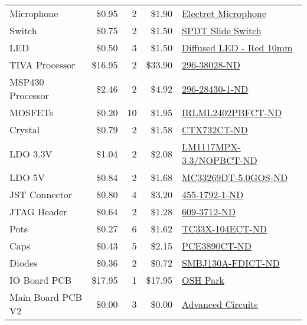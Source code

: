 \begin{table}[h]
\begin{tabular}{lrrrl}
        Microphone & \$0.95 & 2 & \$1.90 & \href{https://www.sparkfun.com/products/8635}{Electret Microphone}\\
        Switch & \$0.75 & 2 & \$1.50 & \href{https://www.sparkfun.com/products/9609}{SPDT Slide Switch}\\
        LED & \$0.50 & 3 & \$1.50 & \href{https://www.sparkfun.com/products/10632}{Diffused LED - Red 10mm}\\
        TIVA Processor & \$16.95 & 2 & \$33.90 & \href{https://www.digikey.com/product-detail/en/TM4C1294NCPDTI3/296-38028-ND/4914951}{296-38028-ND}\\
        MSP430 Processor & \$2.46 & 2 & \$4.92 & \href{https://www.digikey.com/product-detail/en/MSP430G2553IPW20R/296-28430-1-ND/2638889}{296-28430-1-ND}\\
        MOSFETs & \$0.20 & 10 & \$1.95 & \href{https://www.digikey.com/product-detail/en/IRLML2402TRPBF/IRLML2402PBFCT-ND/812508}{IRLML2402PBFCT-ND}\\
        Crystal & \$0.79 & 2 & \$1.58 & \href{https://www.digikey.com/product-detail/en/403C11E16M00000/CTX732CT-ND/1638187}{CTX732CT-ND}\\
        LDO 3.3V & \$1.04 & 2 & \$2.08 & \href{https://www.digikey.com/product-detail/en/LM1117MPX-3.3\%2FNOPB/LM1117MPX-3.3\%2FNOPBCT-ND/1010516}{LM1117MPX-3.3/NOPBCT-ND}\\
        LDO 5V & \$0.84 & 2 & \$1.68 & \href{https://www.digikey.com/product-detail/en/MC33269DT-5.0G/MC33269DT-5.0GOS-ND/1479179}{MC33269DT-5.0GOS-ND}\\
        JST Connector & \$0.80 & 4 & \$3.20 & \href{https://www.digikey.com/product-detail/en/BM06B-SRSS-TB(LF)(SN)/455-1792-1-ND/926863}{455-1792-1-ND}\\
        JTAG Header & \$0.64 & 2 & \$1.28 & \href{https://www.digikey.com/product-detail/en/20021111-00010T4LF/609-3712-ND/2209072}{609-3712-ND}\\
        Pots & \$0.27 & 6 & \$1.62 & \href{https://www.digikey.com/product-detail/en/TC33X-2-104E/TC33X-104ECT-ND/612912}{TC33X-104ECT-ND}\\
        Caps & \$0.43 & 5 & \$2.15 & \href{https://www.digikey.com/product-detail/en/EEE-1CA470WR/PCE3890CT-ND/766266}{PCE3890CT-ND}\\
        Diodes & \$0.36 & 2 & \$0.72 & \href{https://www.digikey.com/product-detail/en/SMBJ130A-13-F/SMBJ130A-FDICT-ND/816052}{SMBJ130A-FDICT-ND}\\
        IO Board PCB & \$17.95 & 1 & \$17.95 & \href{https://oshpark.com/}{OSH Park}\\
        Main Board PCB V2 & \$0.00 & 3 & \$0.00 & \href{http://www.4pcb.com/}{Advanced Circuits}\\
    \end{tabular}
    \label{tab:parts_1}
\end{table}

